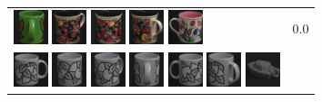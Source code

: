\begin{figure}[!bp]
\begin{tabular}{m{11cm} | m{3cm} |}
\includegraphics[width=1cm]{coil/beeld-35.eps}
\includegraphics[width=1cm]{coil/beeld-63.eps}
\includegraphics[width=1cm]{coil/beeld-62.eps}
\includegraphics[width=1cm]{coil/beeld-64.eps}
\includegraphics[width=1cm]{coil/beeld-7.eps}
& {\scriptsize 0.0}
\\
\includegraphics[width=1cm]{coil/beeld-48.eps}
\includegraphics[width=1cm]{coil/beeld-50.eps}
\includegraphics[width=1cm]{coil/beeld-51.eps}
\includegraphics[width=1cm]{coil/beeld-53.eps}
\includegraphics[width=1cm]{coil/beeld-49.eps}
\includegraphics[width=1cm]{coil/beeld-52.eps}
\includegraphics[width=1cm]{coil/beeld-28.eps}

\end{tabular}
\end{figure}
